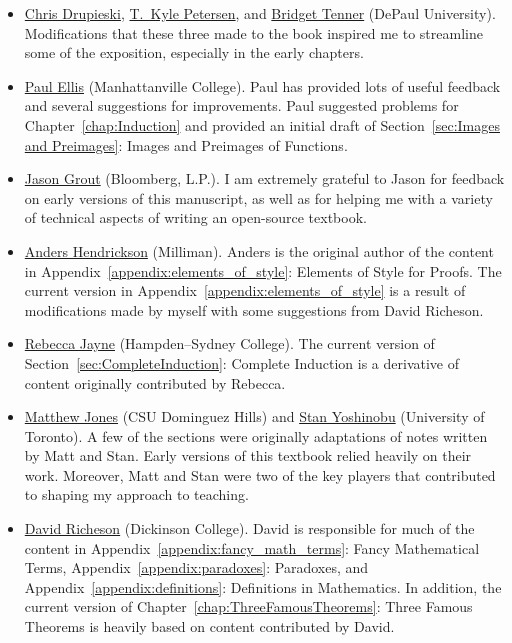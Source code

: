 \begin{itemize}
\item \href{https://math.depaul.edu/cdrupies/}{Chris Drupieski}, \href{http://math.depaul.edu/tpeter21/}{T.~Kyle Petersen}, and \href{http://math.depaul.edu/bridget/}{Bridget Tenner} (DePaul University). Modifications that these three made to the book inspired me to streamline some of the exposition, especially in the early chapters.
\item \href{http://www.paulellis.org}{Paul Ellis} (Manhattanville College). Paul has provided lots of useful feedback and several suggestions for improvements. Paul suggested problems for Chapter~\ref{chap:Induction} and provided an initial draft of Section~\ref{sec:Images and Preimages}: Images and Preimages of Functions.
\item \href{http://jasongrout.org}{Jason Grout} (Bloomberg, L.P.).  I am extremely grateful to Jason for feedback on early versions of this manuscript, as well as for helping me with a variety of technical aspects of writing an open-source textbook.
\item \href{https://www.linkedin.com/in/andershendrickson/}{Anders Hendrickson} (Milliman). Anders is the original author of the content in Appendix~\ref{appendix:elements_of_style}: Elements of Style for Proofs. The current version in Appendix~\ref{appendix:elements_of_style} is a result of modifications made by myself with some suggestions from David Richeson.
\item \href{http://www.hsc.edu/rebecca-jayne}{Rebecca Jayne} (Hampden--Sydney College). The current version of Section~\ref{sec:CompleteInduction}: Complete Induction is a derivative of content originally contributed by Rebecca.
\item \href{http://www4.csudh.edu/library/info/civic-directory/f-j/matthew-g-jones}{Matthew Jones} (CSU Dominguez Hills) and \href{http://www.stanyoshinobu.com}{Stan Yoshinobu} (University of Toronto). A few of the sections were originally adaptations of notes written by Matt and Stan. Early versions of this textbook relied heavily on their work. Moreover, Matt and Stan were two of the key players that contributed to shaping my approach to teaching.
\item \href{http://users.dickinson.edu/~richesod/}{David Richeson} (Dickinson College). David is responsible for much of the content in Appendix~\ref{appendix:fancy_math_terms}: Fancy Mathematical Terms, Appendix~\ref{appendix:paradoxes}: Paradoxes, and Appendix~\ref{appendix:definitions}: Definitions in Mathematics. In addition, the current version of Chapter~\ref{chap:ThreeFamousTheorems}: Three Famous Theorems is heavily based on content contributed by David.

\end{itemize}
